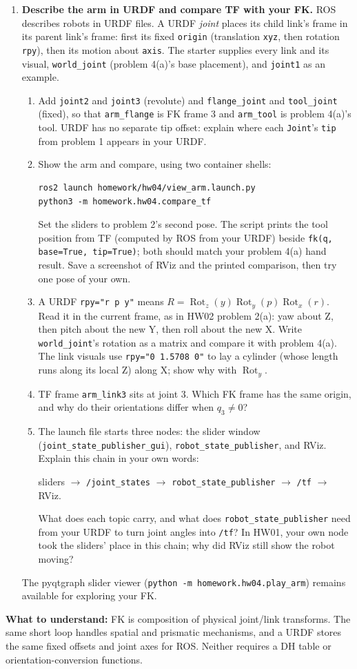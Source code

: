 \newpage
\begin{enumerate}[start=5]
\item \textbf{Describe the arm in URDF and compare TF with your FK.}
ROS describes robots in URDF files. A URDF \emph{joint} places its child
link's frame in its parent link's frame: first its fixed \texttt{origin}
(translation \texttt{xyz}, then rotation \texttt{rpy}), then its motion about
\texttt{axis}. The starter  supplies every link
and its visual, \texttt{world\_joint} (problem 4(a)'s base placement), and
\texttt{joint1} as an example.
\begin{enumerate}
\item Add \texttt{joint2} and \texttt{joint3} (revolute) and
\texttt{flange\_joint} and \texttt{tool\_joint} (fixed), so that
\texttt{arm\_flange} is FK frame 3 and \texttt{arm\_tool} is problem 4(a)'s
tool. URDF has no separate tip offset: explain where each \texttt{Joint}'s
\texttt{tip} from problem 1 appears in your URDF.
\item Show the arm and compare, using two container shells:
\begin{lstlisting}
ros2 launch homework/hw04/view_arm.launch.py
python3 -m homework.hw04.compare_tf
\end{lstlisting}
Set the sliders to problem 2's second pose. The script prints the tool
position from TF (computed by ROS from your URDF) beside
\texttt{fk(q, base=True, tip=True)}; both should match your problem 4(a)
hand result. Save a screenshot of RViz and the printed comparison, then try
one pose of your own.
\item A URDF \texttt{rpy="r p y"} means
$R=\operatorname{Rot}_z(y)\operatorname{Rot}_y(p)\operatorname{Rot}_x(r)$.
Read it in the current frame, as in HW02 problem 2(a): yaw about Z, then
pitch about the new Y, then roll about the new X.
Write \texttt{world\_joint}'s rotation as a matrix and compare it with
problem 4(a). The link visuals use \texttt{rpy="0 1.5708 0"} to lay a
cylinder (whose length runs along its local Z) along X; show why with
$\operatorname{Rot}_y$.
\item TF frame \texttt{arm\_link3} sits at joint 3. Which FK frame has the
same origin, and why do their orientations differ when $q_3\neq 0$?
\item The launch file starts three nodes: the slider window
(\texttt{joint\_state\_publisher\_gui}), \texttt{robot\_state\_publisher},
and RViz. Explain this chain in your own words:
\begin{center}\small
sliders $\longrightarrow$
\texttt{/joint\_states} $\longrightarrow$
\texttt{robot\_state\_publisher} $\longrightarrow$
\texttt{/tf} $\longrightarrow$ RViz.
\end{center}
What does each topic carry, and what does \texttt{robot\_state\_publisher}
need from your URDF to turn joint angles into \texttt{/tf}? In HW01, your
own node took the sliders' place in this chain; why did RViz still show the
robot moving?
\end{enumerate}
The pyqtgraph slider viewer (\texttt{python -m homework.hw04.play\_arm})
remains available for exploring your FK.
\end{enumerate}

\textbf{What to understand:} FK is composition of physical joint/link
transforms. The same short loop handles spatial and prismatic mechanisms,
and a URDF stores the same fixed offsets and joint axes for ROS. Neither
requires a DH table or orientation-conversion functions.

\submission

